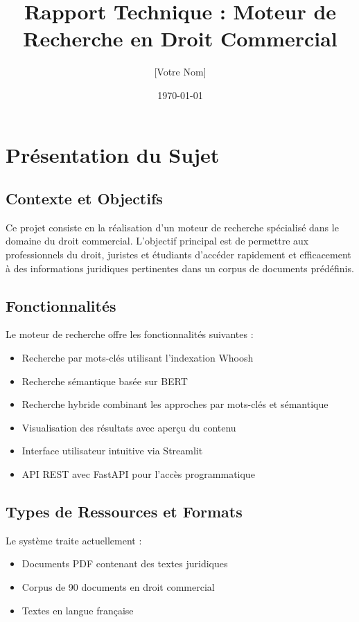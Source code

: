 \documentclass[12pt,a4paper]{article}
\title{Rapport Technique : Moteur de Recherche en Droit Commercial}
\author{[Votre Nom]}
\date{\today}
\begin{document}
\maketitle

\tableofcontents
\newpage

\section{Présentation du Sujet}

\subsection{Contexte et Objectifs}
Ce projet consiste en la réalisation d'un moteur de recherche spécialisé dans le domaine du droit commercial. L'objectif principal est de permettre aux professionnels du droit, juristes et étudiants d'accéder rapidement et efficacement à des informations juridiques pertinentes dans un corpus de documents prédéfinis.

\subsection{Fonctionnalités}
Le moteur de recherche offre les fonctionnalités suivantes :
\begin{itemize}
    \item Recherche par mots-clés utilisant l'indexation Whoosh
    \item Recherche sémantique basée sur BERT
    \item Recherche hybride combinant les approches par mots-clés et sémantique
    \item Visualisation des résultats avec aperçu du contenu
    \item Interface utilisateur intuitive via Streamlit
    \item API REST avec FastAPI pour l'accès programmatique
\end{itemize}

\subsection{Types de Ressources et Formats}
Le système traite actuellement :
\begin{itemize}
    \item Documents PDF contenant des textes juridiques
    \item Corpus de 90 documents en droit commercial
    \item Textes en langue française
\end{itemize}
\end{document}
